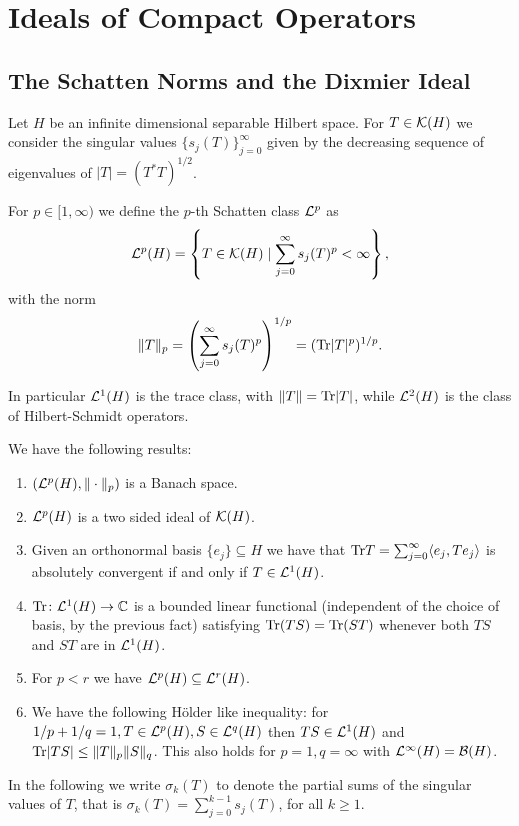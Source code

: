 \section{Ideals of Compact Operators}
\subsection{The Schatten Norms and the Dixmier Ideal}
Let $H$ be an infinite dimensional separable Hilbert space. For $T\in\mathcal{K}(H)$ we consider the singular values $\{s_j(T)\}_{j=0}^\infty$ given by the decreasing sequence of eigenvalues of $|T|=(T^\ast T)^{1/2}$.

\begin{definition}
 For $p\in[1,\infty)$ we define the $p$-th Schatten class $\mathcal{L}^p$ as 
 $$\mathcal{L}^p(H)=\left\{T\in\mathcal{K}(H)\mid\sum_{j=0}^\infty s_j(T)^p<\infty\right\},$$
 with the norm $$\|T\|_p=\left(\sum_{j=0}^\infty s_j(T)^p\right)^{1/p}=(\mathrm{Tr}|T|^p)^{1/p}.$$
\end{definition}

\noindent In particular $\mathcal{L}^1(H)$ is the trace class, with $\|T\|=\mathrm{Tr}|T|$, while $\mathcal{L}^2(H)$ is the class of Hilbert-Schmidt operators. 

\noindent We have the following results:
\begin{fact}
 \begin{enumerate}
  \item $(\mathcal{L}^p(H),\|\cdot\|_p)$ is a Banach space.
  \item $\mathcal{L}^p(H)$ is a two sided ideal of $\mathcal{K}(H)$.
  \item Given an orthonormal basis $\{e_j\}\subseteq H$ we have that $\mathrm{Tr} T=\sum_{j=0}^\infty\langle e_j, Te_j\rangle$ is absolutely convergent if and only if $T\in\mathcal{L}^1(H)$.
  \item $\mathrm{Tr}\colon\mathcal{L}^1(H)\to\mathbb{C}$ is a bounded linear functional (independent of the choice of basis, by the previous fact) satisfying $\mathrm{Tr}(TS)=\mathrm{Tr}(ST)$ whenever both $TS$ and $ST$ are in $\mathcal{L}^1(H)$.
  \item For $p<r$ we have $\mathcal{L}^p(H)\subseteq\mathcal{L}^r(H)$.
  \item We have the following Hölder like inequality: for $1/p+1/q=1,T\in\mathcal{L}^p(H),S\in\mathcal{L}^q(H)$ then $TS\in\mathcal{L}^1(H)$ and $\mathrm{Tr}|TS|\leq\|T\|_p\|S\|_q$. This also holds for $p=1,q=\infty$ with $\mathcal{L}^\infty(H)=\mathcal{B}(H)$.
 \end{enumerate}
\end{fact}

\noindent In the following we write $\sigma_k(T)$ to denote the partial sums of the singular values of $T$, that is $\sigma_k(T)=\sum_{j=0}^{k-1}s_j(T)$, for all $k\geq 1$.

